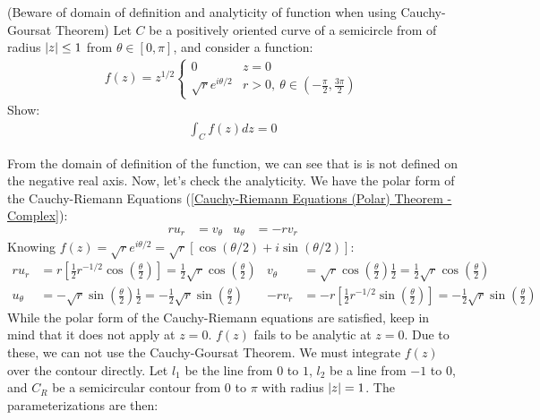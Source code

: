 \documentclass[12pt, english]{book}
\makeatletter
\renewenvironment{proof}[1][\proofname]{\par
	\pushQED{\qed}%
	\normalfont \topsep6\p@\@plus6\p@\relax
	\list{}{%
		\settowidth{\leftmargin}{\itshape\proofname:\hskip\labelsep}%
		\setlength{\labelwidth}{0pt}%
		\setlength{\itemindent}{-\leftmargin}%
	}%
	\item[\hskip\labelsep\itshape#1\@addpunct{:}]\ignorespaces
	}{ \popQED\endlist\@endpefalse}
\makeatother
\begin{document}
	\begin{example}(Beware of domain of definition and analyticity of function when using Cauchy-Goursat Theorem)
		Let \(C\) be a positively oriented curve of a semicircle from of radius \(\abs{z} \leq 1\) from \(\theta \in [0, \pi]\), and consider a function:
		\begin{align*}
			f(z) = z^{1/2}
			\begin{cases}
				0 & z = 0 \\
				\sqrt{r} e^{i\theta/2} & r>0, \ \theta \in \left(-\frac{\pi}{2}, \frac{3\pi}{2}\right)
			\end{cases}
		\end{align*}
		Show:
		\begin{align*}
			\int_{C} f(z) dz = 0
		\end{align*}
		\begin{proof}
			{\color{Grey}
			From the domain of definition of the function, we can see that is is not defined on the negative real axis. Now, let's check the analyticity. We have the polar form of the Cauchy-Riemann Equations (\cref{Cauchy-Riemann Equations (Polar) Theorem - Complex}):
			\begin{align*}
				ru_r &= v_\theta &
				u_\theta &= -rv_r
			\end{align*}
			Knowing \(f(z) = \sqrt{r}e^{i\theta/2} = \sqrt{r}[\cos(\theta/2) + i \sin(\theta/2)]\):
			\begin{align*}
				r u_r &= r\left[\frac{1}{2}r^{-1/2} \cos\left(\frac{\theta}{2}\right)\right]
						= \frac{1}{2}\sqrt{r} \cos\left(\frac{\theta}{2}\right) &
				v_\theta &= \sqrt{r} \cos\left(\frac{\theta}{2}\right) \frac{1}{2} 
							= \frac{1}{2}\sqrt{r}\cos\left(\frac{\theta}{2}\right) \\
				u_\theta &= -\sqrt{r}\sin\left(\frac{\theta}{2}\right) \frac{1}{2}
							= - \frac{1}{2} \sqrt{r} \sin\left(\frac{\theta}{2}\right) &
				-rv_r &= -r \left[\frac{1}{2} r^{-1/2} \sin\left(\frac{\theta}{2}\right)\right]
						= -\frac{1}{2} \sqrt{r} \sin\left(\frac{\theta}{2}\right)
			\end{align*}
			While the polar form of the Cauchy-Riemann equations are satisfied, keep in mind that it does not apply at \(z=0\). \(f(z)\) fails to be analytic at \(z=0\). Due to these, we can not use the Cauchy-Goursat Theorem. We must integrate \(f(z)\) over the contour directly. Let \(l_1\) be the line from \(0\) to \(1\), \(l_2\) be a line from \(-1\) to \(0\), and \(C_R\) be a semicircular contour from \(0\) to \(\pi\) with radius \(\abs{z}=1\). The parameterizations are then: 
}
\end{proof}
\end{example}
\end{document}
